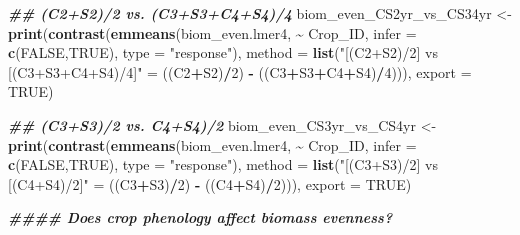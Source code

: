 \documentclass[
]{article}
\newenvironment{Shaded}{\begin{snugshade}}{\end{snugshade}}
\newcommand{\AttributeTok}[1]{\textcolor[rgb]{0.13,0.29,0.53}{#1}}
\newcommand{\ConstantTok}[1]{\textcolor[rgb]{0.56,0.35,0.01}{#1}}
\newcommand{\DecValTok}[1]{\textcolor[rgb]{0.00,0.00,0.81}{#1}}
\newcommand{\DocumentationTok}[1]{\textcolor[rgb]{0.56,0.35,0.01}{\textbf{\textit{#1}}}}
\newcommand{\FunctionTok}[1]{\textcolor[rgb]{0.13,0.29,0.53}{\textbf{#1}}}
\newcommand{\NormalTok}[1]{#1}
\newcommand{\OtherTok}[1]{\textcolor[rgb]{0.56,0.35,0.01}{#1}}
\newcommand{\SpecialCharTok}[1]{\textcolor[rgb]{0.81,0.36,0.00}{\textbf{#1}}}
\newcommand{\StringTok}[1]{\textcolor[rgb]{0.31,0.60,0.02}{#1}}
\begin{document}
\begin{Shaded}
\begin{Highlighting}[]
\DocumentationTok{\#\# (C2+S2)/2 vs. (C3+S3+C4+S4)/4}
\NormalTok{biom\_even\_CS2yr\_vs\_CS34yr }\OtherTok{\textless{}{-}} \FunctionTok{print}\NormalTok{(}\FunctionTok{contrast}\NormalTok{(}\FunctionTok{emmeans}\NormalTok{(biom\_even.lmer4, }\SpecialCharTok{\textasciitilde{}}\NormalTok{ Crop\_ID,}
                                                    \AttributeTok{infer =} \FunctionTok{c}\NormalTok{(}\ConstantTok{FALSE}\NormalTok{,}\ConstantTok{TRUE}\NormalTok{), }
                                                    \AttributeTok{type =} \StringTok{"response"}\NormalTok{),}
                                            \AttributeTok{method =} \FunctionTok{list}\NormalTok{(}\StringTok{"[(C2+S2)/2] vs [(C3+S3+C4+S4)/4]"} \OtherTok{=}
\NormalTok{                                                            ((C2}\SpecialCharTok{+}\NormalTok{S2)}\SpecialCharTok{/}\DecValTok{2}\NormalTok{) }\SpecialCharTok{{-}}\NormalTok{ ((C3}\SpecialCharTok{+}\NormalTok{S3}\SpecialCharTok{+}\NormalTok{C4}\SpecialCharTok{+}\NormalTok{S4)}\SpecialCharTok{/}\DecValTok{4}\NormalTok{))), }
                                   \AttributeTok{export =} \ConstantTok{TRUE}\NormalTok{)}

\DocumentationTok{\#\# (C3+S3)/2 vs. C4+S4)/2}
\NormalTok{biom\_even\_CS3yr\_vs\_CS4yr }\OtherTok{\textless{}{-}} \FunctionTok{print}\NormalTok{(}\FunctionTok{contrast}\NormalTok{(}\FunctionTok{emmeans}\NormalTok{(biom\_even.lmer4, }\SpecialCharTok{\textasciitilde{}}\NormalTok{ Crop\_ID, }
                                                   \AttributeTok{infer =} \FunctionTok{c}\NormalTok{(}\ConstantTok{FALSE}\NormalTok{,}\ConstantTok{TRUE}\NormalTok{),}
                                                   \AttributeTok{type =} \StringTok{"response"}\NormalTok{),}
                                           \AttributeTok{method =} \FunctionTok{list}\NormalTok{(}\StringTok{"[(C3+S3)/2] vs [(C4+S4)/2]"} \OtherTok{=}
\NormalTok{                                                           ((C3}\SpecialCharTok{+}\NormalTok{S3)}\SpecialCharTok{/}\DecValTok{2}\NormalTok{) }\SpecialCharTok{{-}}\NormalTok{ ((C4}\SpecialCharTok{+}\NormalTok{S4)}\SpecialCharTok{/}\DecValTok{2}\NormalTok{))),}
                                  \AttributeTok{export =} \ConstantTok{TRUE}\NormalTok{)}

\DocumentationTok{\#\#\#\# Does crop phenology affect biomass evenness?}


\end{Highlighting}
\end{Shaded}
\end{document}
